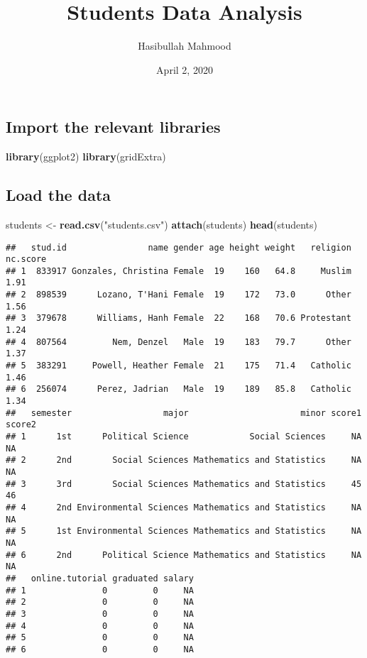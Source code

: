 \documentclass[
]{article}
\title{Students Data Analysis}
\author{Hasibullah Mahmood}
\date{April 2, 2020}
\newenvironment{Shaded}{\begin{snugshade}}{\end{snugshade}}
\newcommand{\KeywordTok}[1]{\textcolor[rgb]{0.13,0.29,0.53}{\textbf{#1}}}
\newcommand{\NormalTok}[1]{#1}
\newcommand{\StringTok}[1]{\textcolor[rgb]{0.31,0.60,0.02}{#1}}
\begin{document}
\maketitle

\hypertarget{import-the-relevant-libraries}{%
\subsection{Import the relevant
libraries}\label{import-the-relevant-libraries}}

\begin{Shaded}
\begin{Highlighting}[]
\KeywordTok{library}\NormalTok{(ggplot2)}
\KeywordTok{library}\NormalTok{(gridExtra)}
\end{Highlighting}
\end{Shaded}

\hypertarget{load-the-data}{%
\subsection{Load the data}\label{load-the-data}}

\begin{Shaded}
\begin{Highlighting}[]
\NormalTok{students <-}\StringTok{ }\KeywordTok{read.csv}\NormalTok{(}\StringTok{"students.csv"}\NormalTok{)}
\KeywordTok{attach}\NormalTok{(students)}
\KeywordTok{head}\NormalTok{(students)}
\end{Highlighting}
\end{Shaded}

\begin{verbatim}
##   stud.id                name gender age height weight   religion nc.score
## 1  833917 Gonzales, Christina Female  19    160   64.8     Muslim     1.91
## 2  898539      Lozano, T'Hani Female  19    172   73.0      Other     1.56
## 3  379678      Williams, Hanh Female  22    168   70.6 Protestant     1.24
## 4  807564         Nem, Denzel   Male  19    183   79.7      Other     1.37
## 5  383291     Powell, Heather Female  21    175   71.4   Catholic     1.46
## 6  256074      Perez, Jadrian   Male  19    189   85.8   Catholic     1.34
##   semester                  major                      minor score1 score2
## 1      1st      Political Science            Social Sciences     NA     NA
## 2      2nd        Social Sciences Mathematics and Statistics     NA     NA
## 3      3rd        Social Sciences Mathematics and Statistics     45     46
## 4      2nd Environmental Sciences Mathematics and Statistics     NA     NA
## 5      1st Environmental Sciences Mathematics and Statistics     NA     NA
## 6      2nd      Political Science Mathematics and Statistics     NA     NA
##   online.tutorial graduated salary
## 1               0         0     NA
## 2               0         0     NA
## 3               0         0     NA
## 4               0         0     NA
## 5               0         0     NA
## 6               0         0     NA
\end{verbatim}
\end{document}
